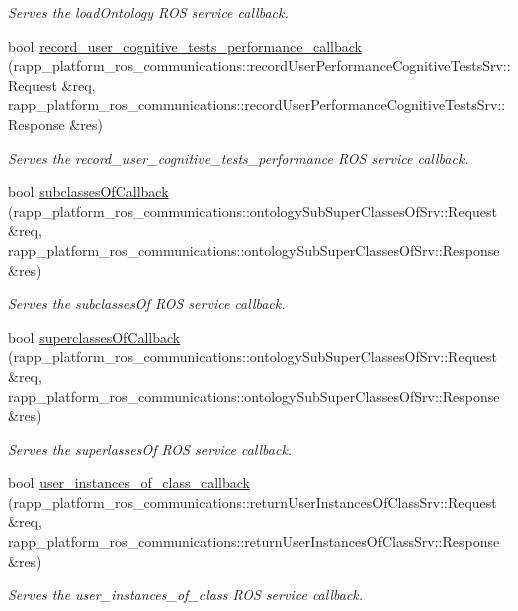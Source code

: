 \begin{DoxyCompactItemize}
\begin{DoxyCompactList}\small\item\em Serves the load\-Ontology R\-O\-S service callback. \end{DoxyCompactList}\item 
bool \hyperlink{classKnowrobWrapperCommunications_a4c2e5ed4bf27e9ae7d722b50d8f607e3}{record\-\_\-user\-\_\-cognitive\-\_\-tests\-\_\-performance\-\_\-callback} (rapp\-\_\-platform\-\_\-ros\-\_\-communications\-::record\-User\-Performance\-Cognitive\-Tests\-Srv\-::\-Request \&req, rapp\-\_\-platform\-\_\-ros\-\_\-communications\-::record\-User\-Performance\-Cognitive\-Tests\-Srv\-::\-Response \&res)
\begin{DoxyCompactList}\small\item\em Serves the record\-\_\-user\-\_\-cognitive\-\_\-tests\-\_\-performance R\-O\-S service callback. \end{DoxyCompactList}\item 
bool \hyperlink{classKnowrobWrapperCommunications_a4d0118b6016bd1df21abca155ae9b423}{subclasses\-Of\-Callback} (rapp\-\_\-platform\-\_\-ros\-\_\-communications\-::ontology\-Sub\-Super\-Classes\-Of\-Srv\-::\-Request \&req, rapp\-\_\-platform\-\_\-ros\-\_\-communications\-::ontology\-Sub\-Super\-Classes\-Of\-Srv\-::\-Response \&res)
\begin{DoxyCompactList}\small\item\em Serves the subclasses\-Of R\-O\-S service callback. \end{DoxyCompactList}\item 
bool \hyperlink{classKnowrobWrapperCommunications_aa2f78a0238538e4c047ee7d931969219}{superclasses\-Of\-Callback} (rapp\-\_\-platform\-\_\-ros\-\_\-communications\-::ontology\-Sub\-Super\-Classes\-Of\-Srv\-::\-Request \&req, rapp\-\_\-platform\-\_\-ros\-\_\-communications\-::ontology\-Sub\-Super\-Classes\-Of\-Srv\-::\-Response \&res)
\begin{DoxyCompactList}\small\item\em Serves the superlasses\-Of R\-O\-S service callback. \end{DoxyCompactList}\item 
bool \hyperlink{classKnowrobWrapperCommunications_aa0de5d8940bd5b84b44306eb193d4adc}{user\-\_\-instances\-\_\-of\-\_\-class\-\_\-callback} (rapp\-\_\-platform\-\_\-ros\-\_\-communications\-::return\-User\-Instances\-Of\-Class\-Srv\-::\-Request \&req, rapp\-\_\-platform\-\_\-ros\-\_\-communications\-::return\-User\-Instances\-Of\-Class\-Srv\-::\-Response \&res)
\begin{DoxyCompactList}\small\item\em Serves the user\-\_\-instances\-\_\-of\-\_\-class R\-O\-S service callback. \end{DoxyCompactList}\item 

\end{DoxyCompactItemize}
